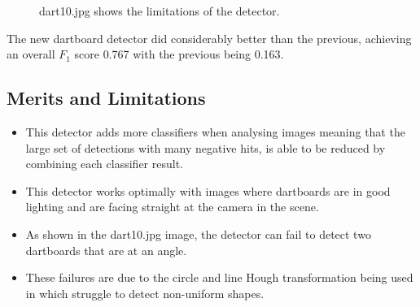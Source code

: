 \documentclass[a4paper]{article}
\begin{document}
\begin{figure}[H]
  \centering
  \hfill
   \hfill
   \hfill
   \caption{dart10.jpg shows the limitations of the detector.}
\end{figure}

The new dartboard detector did considerably better than the previous, achieving
an overall \(F_{1}\) score 0.767 with the previous being 0.163.

\subsection*{Merits and Limitations}
\vspace{-0.7em}
\begin{itemize}
    \item This detector adds more classifiers when analysing images meaning
      that the large set of detections with many negative hits, is able to be
      reduced by combining each classifier result.
    \item  This detector works optimally with images where dartboards are in
      good lighting and are facing straight at the camera in the scene.
    \item As shown in the dart10.jpg image, the detector can fail to detect two
      dartboards that are at an angle.
    \item These failures are due to the circle and line Hough transformation
      being used in which struggle to detect non-uniform shapes.
\end{itemize}
\end{document}
